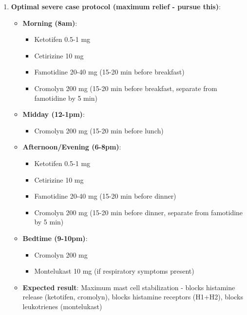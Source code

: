 \begin{enumerate}
    \item \textbf{Optimal severe case protocol (maximum relief - pursue this)}:
    \begin{itemize}
        \item \textbf{Morning (8am)}:
        \begin{itemize}
            \item Ketotifen 0.5-1 mg
            \item Cetirizine 10 mg
            \item Famotidine 20-40 mg (15-20 min before breakfast)
            \item Cromolyn 200 mg (15-20 min before breakfast, separate from famotidine by 5 min)
        \end{itemize}
        \item \textbf{Midday (12-1pm)}:
        \begin{itemize}
            \item Cromolyn 200 mg (15-20 min before lunch)
        \end{itemize}
        \item \textbf{Afternoon/Evening (6-8pm)}:
        \begin{itemize}
            \item Ketotifen 0.5-1 mg
            \item Cetirizine 10 mg
            \item Famotidine 20-40 mg (15-20 min before dinner)
            \item Cromolyn 200 mg (15-20 min before dinner, separate from famotidine by 5 min)
        \end{itemize}
        \item \textbf{Bedtime (9-10pm)}:
        \begin{itemize}
            \item Cromolyn 200 mg
            \item Montelukast 10 mg (if respiratory symptoms present)
        \end{itemize}
        \item \textbf{Expected result}: Maximum mast cell stabilization - blocks histamine release (ketotifen, cromolyn), blocks histamine receptors (H1+H2), blocks leukotrienes (montelukast)
    \end{itemize}


\end{enumerate}
